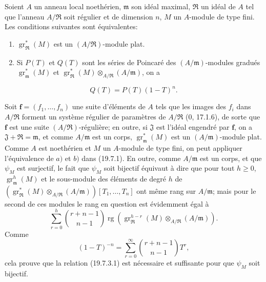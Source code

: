 \begin{corollary}[19.7.3]
\label{IV.19.7.3}
Soient $A$ un anneau local noethérien, $\mathfrak m$ son idéal maximal, $\mathfrak R$ un idéal de $A$ tel que l'anneau $A/\mathfrak R$ soit régulier et de dimension $n$, $M$ un $A$-module de type fini. Les conditions suivantes sont équivalentes:
\begin{enumerate}
  \item[a)] $\operatorname{gr}_{\mathfrak R}^*(M)$ est un $(A/\mathfrak R)$-module plat.
  \item[b)] Si $P(T)$ et $Q(T)$ sont les séries de Poincaré des $(A/\mathfrak m)$-modules gradués $\operatorname{gr}_{\mathfrak m}^*(M)$ et $\operatorname{gr}_{\mathfrak R}^*(M)\otimes_{A/\mathfrak R}(A/\mathfrak m)$, on a
\end{enumerate}
\begin{equation}
  Q(T)=P(T)(1-T)^n.
  \tag{19.7.3.1}\label{IV.19.7.3.1}
\end{equation}

Soit $\mathbf f=(f_1,\ldots,f_n)$ une suite d'éléments de $A$ tels que les images des $f_i$ dans $A/\mathfrak R$ forment un système régulier de paramètres de $A/\mathfrak R$ ($0$, 17.1.6), de sorte que $\mathbf f$ est une suite $(A/\mathfrak R)$-régulière; en outre, si $\mathfrak J$ est l'idéal engendré par $\mathbf f$, on a $\mathfrak J+\mathfrak R=\mathfrak m$, et comme $A/\mathfrak m$ est un corps, $\operatorname{gr}_{\mathfrak m}^*(M)$ est un $(A/\mathfrak m)$-module plat. Comme $A$ est noethérien et $M$ un $A$-module de type fini, on peut appliquer l'équivalence de $a)$ et $b)$ dans (19.7.1). En outre, comme $A/\mathfrak m$ est un corps, et que $\psi_M$ est surjectif, le fait que $\psi_M$ soit bijectif équivaut à dire que pour tout $h\geq0$, $\operatorname{gr}_{\mathfrak m}^h(M)$ et le sous-module des éléments de degré $h$ de $(\operatorname{gr}_{\mathfrak R}^*(M)\otimes_{A/\mathfrak R}(A/\mathfrak m))[T_1,\ldots,T_n]$ ont même rang sur $A/\mathfrak m$; mais pour le second de ces modules le rang en question est évidemment égal à
\[
  \sum_{r=0}^h\binom{r+n-1}{n-1}\operatorname{rg}(\operatorname{gr}_{\mathfrak R}^{h-r}(M)\otimes_{A/\mathfrak R}(A/\mathfrak m)).
\]
Comme
\[
  (1-T)^{-n}=\sum_{r=0}^{\infty}\binom{r+n-1}{n-1}T^r,
\]
cela prouve que la relation (19.7.3.1) est nécessaire et suffisante pour que $\psi_M$ soit bijectif.
\end{corollary}

